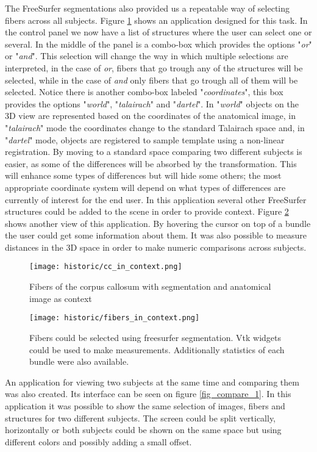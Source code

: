 The FreeSurfer segmentations also provided us a repeatable way of selecting fibers across all subjects. Figure \ref{fig_cc_ctx_1} shows an application designed for this task. In the control panel we now have a list of structures where the user can select one or several. In the middle of the panel is a combo-box which provides the options "\emph{or}" or "\emph{and}". This selection will change the way in which multiple selections are interpreted, in the case of \emph{or}, fibers that go trough any of the structures will be selected, while in the case of \emph{and} only fibers that go trough all of them will be selected. Notice there is another combo-box labeled "\emph{coordinates}", this box provides the options "\emph{world}", "\emph{talairach}" and "\emph{dartel}". In "\emph{world}" objects on the 3D view are represented based on the coordinates of the anatomical image, in "\emph{talairach}" mode the coordinates change to the standard Talairach space and, in "\emph{dartel}" mode, objects are registered to sample template using a non-linear registration. By moving to a standard space comparing two different subjects is easier, as some of the differences will be absorbed by the transformation. This will enhance some types of differences but will hide some others; the most appropriate coordinate system will depend on what types of differences are currently of interest for the end user. In this application several other FreeSurfer structures could be added to the scene in order to provide context. Figure \ref{fig_fibers_ctx} shows another view of this application. By hovering the cursor on top of a bundle the user could get some information about them. It was also possible to measure distances in the 3D space in order to make numeric comparisons across subjects.

\begin{figure}
\centering
\texttt{[image: historic/cc\_in\_context.png]} 
\caption{\label{fig_cc_ctx_1}Fibers of the corpus callosum with segmentation and anatomical image as context}
\end{figure}

\begin{figure}
\centering
\texttt{[image: historic/fibers\_in\_context.png]} 
\caption{\label{fig_fibers_ctx}Fibers could be selected using freesurfer segmentation. Vtk widgets could be used to make measurements.
Additionally statistics of each bundle were also available.}
\end{figure}

An application for viewing two subjects at the same time and comparing them was also created. Its interface can be seen on figure \ref{fig_compare_1}. In this application it was possible to show the same selection of images, fibers and structures for two different subjects. The screen could be split vertically, horizontally or both subjects could be shown on the same space but using different colors and possibly adding a small offset.

